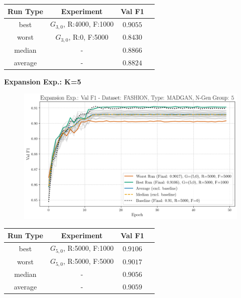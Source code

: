 \begin{table}[H]
	\vspace{-1em}
	\centering
	\begin{tabular}{|c|c|c|c|}
		\hline
		Run Type & Experiment & Val F1 \\ \hline
		best & \(G_{3, 0}\), R:4000, F:1000 & $0.9055$\\ \hline
		worst & \(G_{3, 0}\), R:0, F:5000 & $0.8430$\\ \hline
		median & - & $0.8866$\\ \hline
		average & - & $0.8824$
		\\ \hline
	\end{tabular}
\end{table}
\newpage
\noindent\textbf{Expansion Exp.: K=5}
\begin{figure}[htbp]
	\centering
	\includegraphics[width=.85\textwidth]{abb/strat_classifier_performance/FASHION_STRATIFIED_CLASSIFIERS_MADGAN_NEW/expansion_experiments/val_f1_score_MADGAN_FASHION_n_gen_5_all.png}
	\label{fig:app_strat_class_performance_expansion_exp._val_f1_score_5}
\end{figure}
\begin{table}[H]
	\vspace{-1em}
	\centering
	\begin{tabular}{|c|c|c|c|}
		\hline
		Run Type & Experiment & Val F1 \\ \hline
		best & \(G_{5, 0}\), R:5000, F:1000 & $0.9106$\\ \hline
		worst & \(G_{5, 0}\), R:5000, F:5000 & $0.9017$\\ \hline
		median & - & $0.9056$\\ \hline
		average & - & $0.9059$
		\\ \hline
	\end{tabular}
\end{table}

